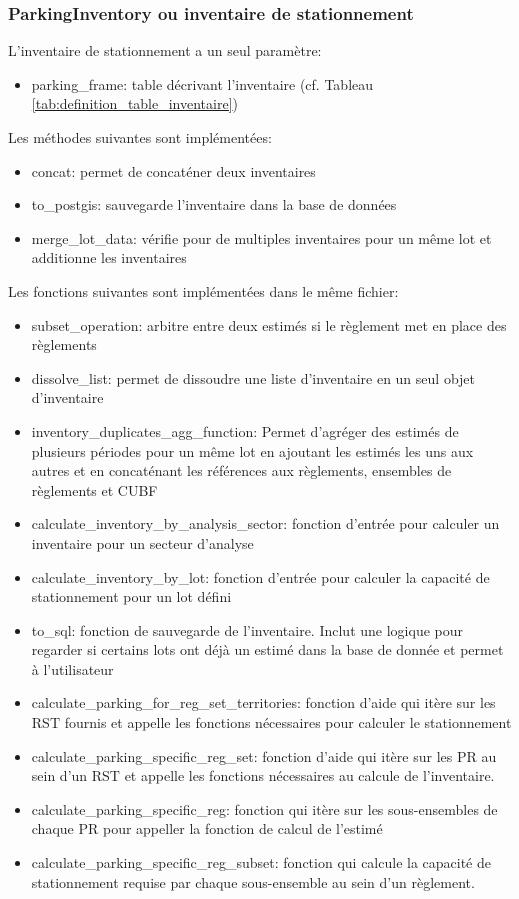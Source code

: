         \subsubsection{ParkingInventory ou inventaire de stationnement}
        L'inventaire de stationnement a un seul paramètre: 
        \begin{itemize}
            \item parking\_frame: table décrivant l'inventaire (cf. Tableau \ref{tab:definition_table_inventaire})
        \end{itemize}
        Les méthodes suivantes sont implémentées:
        \begin{itemize}
            \item concat: permet de concaténer deux inventaires
            \item to\_postgis: sauvegarde l'inventaire dans la base de données
            \item merge\_lot\_data: vérifie pour de multiples inventaires pour un même lot et additionne les inventaires
        \end{itemize}
        Les fonctions suivantes sont implémentées dans le même fichier: 
        \begin{itemize}
            \item subset\_operation: arbitre entre deux estimés si le règlement met en place des règlements
            \item dissolve\_list: permet de dissoudre une liste d'inventaire en un seul objet d'inventaire
            \item inventory\_duplicates\_agg\_function: Permet d'agréger des estimés de plusieurs périodes pour un même lot en ajoutant les estimés les uns aux autres et en concaténant les références aux règlements, ensembles de règlements et \ac{CUBF}
            \item calculate\_inventory\_by\_analysis\_sector: fonction d'entrée pour calculer un inventaire pour un secteur d'analyse
            \item calculate\_inventory\_by\_lot: fonction d'entrée pour calculer la capacité de stationnement pour un lot défini
            \item to\_sql: fonction de sauvegarde de l'inventaire. Inclut une logique pour regarder si certains lots ont déjà un estimé dans la base de donnée et permet à l'utilisateur 
            \item calculate\_parking\_for\_reg\_set\_territories: fonction d'aide qui itère sur les \ac{RST} fournis et appelle les fonctions nécessaires pour calculer le stationnement
            \item calculate\_parking\_specific\_reg\_set: fonction d'aide qui itère sur les \ac{PR} au sein d'un \ac{RST} et appelle les fonctions nécessaires au calcule de l'inventaire.
            \item calculate\_parking\_specific\_reg: fonction qui itère sur les sous-ensembles de chaque \ac{PR} pour appeller la fonction de calcul de l'estimé
            \item calculate\_parking\_specific\_reg\_subset: fonction qui calcule la capacité de stationnement requise par chaque sous-ensemble au sein d'un règlement.
        \end{itemize}
